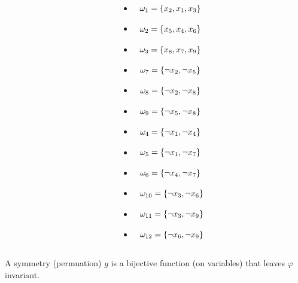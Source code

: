 \documentclass{beamer}
\begin{document}
\begin{frame}
\begin{columns}[t]
\begin{column}[T]{.3\textwidth}
		\end{column}
		\begin{column}[T]{.3\textwidth}
		\tiny
		\begin{itemize} 
		\item[] $\tikz[baseline]{\node[anchor=base] (b1){};} \omega_{1} = \{x_2  ,  x_1  ,  x_3\}$
		\item[] $\tikz[baseline]{\node[anchor=base] (b2){};} \omega_{2} = \{x_5  ,  x_4  ,  x_6\} $
		\item[] $\tikz[baseline]{\node[anchor=base] (b3){};} \omega_{3} = \{x_8  ,  x_7  ,  x_9\} $
		\item[] $\tikz[baseline]{\node[anchor=base] (b4){};} \omega_{7} = \{\neg x_2  ,  \neg x_5\} $
		\item[] $\tikz[baseline]{\node[anchor=base] (b5){};} \omega_{8} = \{\neg x_2  ,  \neg x_8\} $
		\item[] $\tikz[baseline]{\node[anchor=base] (b6){};} \omega_{9} = \{\neg x_5  ,  \neg x_8\} $
		\item[] $\tikz[baseline]{\node[anchor=base] (b7){};} \omega_{4} = \{\neg x_1  ,  \neg x_4\} $
		\item[] $\tikz[baseline]{\node[anchor=base] (b8){};} \omega_{5} = \{\neg x_1  ,  \neg x_7\} $
		\item[] $\tikz[baseline]{\node[anchor=base] (b9){};} \omega_{6} = \{\neg x_4  ,  \neg x_7\} $
		\item[] $\tikz[baseline]{\node[anchor=base] (b10){};} \omega_{10} = \{\neg x_3  ,  \neg x_6\} $
		\item[] $\tikz[baseline]{\node[anchor=base] (b11){};} \omega_{11} = \{\neg x_3  ,  \neg x_9\} $
		\item[] $\tikz[baseline]{\node[anchor=base] (b12){};} \omega_{12} = \{\neg x_6  ,  \neg x_9\} $
	\end{itemize}
	\end{column}
\end{columns}

\vfill
	A symmetry (permuation) $g$ is a bijective function (on variables) that leaves $\varphi$ invariant.
%	
	
	\vfill
\end{frame}
\end{document}
